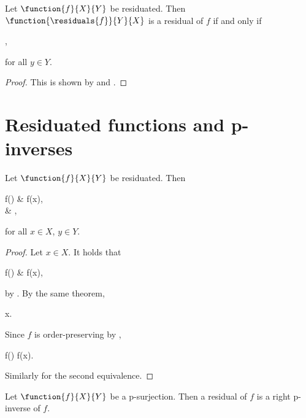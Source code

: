 \documentclass[b5paper, english, oneside]{memoir}
\begin{document}
\begin{theorem}
\label{SupremumResidual}
Let $\function{f}{X}{Y}$ be residuated. Then $\function{\residuals{f}}{Y}{X}$ is a residual of $f$ if and only if 
\begin{eqs}
 \in {},
\end{eqs}
for all $y \in Y$.
\end{theorem}

\begin{proof}
This is shown by  and .
\end{proof}

\section{Residuated functions and p-inverses}

\begin{theorem}
\label{ResidualIsGeneralizedPInverse}
Let $\function{f}{X}{Y}$ be residuated. Then
\begin{eqs}
f() & \preeqb f(x), \\
 & \preeq {},
\end{eqs}
for all $x \in X$, $y \in Y$.
\end{theorem}

\begin{proof}
Let $x \in X$. It holds that
\begin{eqs}
f() & \preleqb f(x),
\end{eqs}
by . By the same theorem,
\begin{eqs}
 \pregeq x.
\end{eqs}
Since $f$ is order-preserving by ,
\begin{eqs}
f() \pregeqb f(x).
\end{eqs}
Similarly for the second equivalence.
\end{proof}

\begin{theorem}
\label{ResidualIsRightPInverseForPSurjection}
Let $\function{f}{X}{Y}$ be a p-surjection. Then a residual of $f$ is a right p-inverse of $f$.
\end{theorem}
\end{document}
